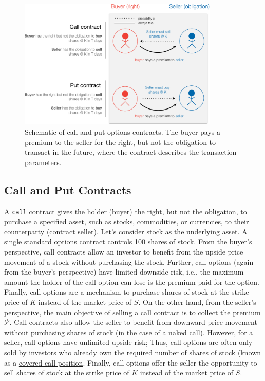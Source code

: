 \documentclass[11pt]{article}
\theoremstyle{definition}
\begin{document}
\begin{figure}[ht]
    \centering
    \includegraphics[width=0.85\textwidth]{./figs/Fig-Options-Table-Schematic.pdf}
    \caption{Schematic of call and put options contracts. The buyer pays a premium to the seller for the right, but 
	not the obligation to transact in the future, where the contract describes the transaction parameters.}\label{fig:options-schematic}
\end{figure}

\subsection*{Call and Put Contracts}
A \texttt{call} contract gives the holder (buyer) the right, but not the obligation, to purchase a specified asset, 
such as stocks, commodities, or currencies, to their counterparty (contract seller). 
Let's consider stock as the underlying asset. A single standard options contract controls 100 shares of stock. 
From the buyer's perspective, call contracts allow an investor to benefit from the upside price movement of a stock without purchasing the stock.
Further, call options (again from the buyer's perspective) have limited downside risk, i.e., the maximum amount the holder of the call option can lose 
is the premium paid for the option. Finally, call options are a mechanism to purchase shares of stock at the strike price of $K$ instead of the market price of $S$. 
On the other hand, from the seller's perspective, the main objective of selling a call contract is to collect the premium $\mathcal{P}$. 
Call contracts also allow the seller to benefit from downward price movement without purchasing shares of stock (in the case of a naked call).
However, for a seller, call options have unlimited upside risk; 
Thus, call options are often only sold by investors who already own the required number of shares of stock 
(known as a \href{https://www.investopedia.com/terms/c/coveredcall.asp}{covered call position}. 
Finally, call options offer the seller the opportunity to sell shares of stock at the strike price of $K$ instead of the market price of $S$.
\end{document}
